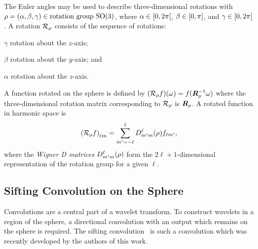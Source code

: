The Euler angles may be used to describe three-dimensional rotations with \(\rho = (\alpha,\beta,\gamma) \in \text{rotation group } \text{SO(3)}{}\), where \(\alpha \in \interval[open right]{0}{2\pi}\), \(\beta \in \interval{0}{\pi}\), and \(\gamma \in \interval[open right]{0}{2\pi}\).
A rotation \(\mathcal{R}_{\rho}\) consists of the sequence of rotations:
%
\begin{inparaenum}[(i)]
	\item \({\gamma}\) rotation about the \(z\)-axis;
	\item \({\beta}\) rotation about the \(y\)-axis; and
	\item \({\alpha}\) rotation about the \(z\)-axis.
\end{inparaenum}
%
A function rotated on the sphere is defined by \((\mathcal{R}_{\rho}f)(\omega) = f(\vb*{R}_{\rho}^{-1} \omega)\) where the three-dimensional rotation matrix corresponding to \(\mathcal{R}_{\rho}\) is \(\vb*{R}_{\rho}\).
A rotated function in harmonic space is
%
\begin{equation}
	{(\mathcal{R}_{\rho}f)}_{\ell m}
	= \sum\limits_{m'=-\ell}^{\ell} D^{\ell}_{m'm}(\rho) f_{\ell m'},
\end{equation}
%
where the \emph{Wigner D matrices} \(D^{\ell}_{m'm}(\rho)\) form the \(2\ell+1\)-dimensional representation of the rotation group for a given \({\ell}\).

\subsection{Sifting Convolution on the Sphere}\label{sec:chapter3_sifting_convolution_sphere}

Convolutions are a central part of a wavelet transform.
To construct wavelets in a region of the sphere, a directional convolution with an output which remains on the sphere is required.
The sifting convolution~\cite{Roddy2021} is such a convolution which was recently developed by the authors of this work.

